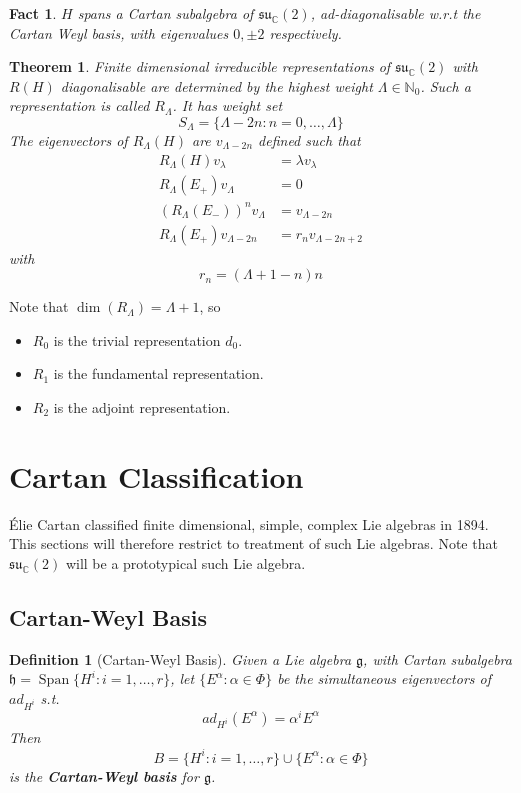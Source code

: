 \documentclass{article}
\newtheorem{theorem}{Theorem}[subsection]
\newtheorem{definition}{Definition}[subsection]
\newtheorem{fact}{Fact}[subsection]
\DeclareMathOperator{\spn}{Span}
\newcommand{\bam}[1]{\textbf{#1}}
\newcommand{\mf}[1]{\mathfrak{#1}}
\newcommand{\mbb}[1]{\mathbb{#1}}
\newcommand{\set}[1]{\lbrace #1 \rbrace}
\begin{document}
\begin{fact}
$H$ spans a Cartan subalgebra of $\mf{su}_\mbb{C}(2)$, ad-diagonalisable w.r.t the Cartan Weyl basis, with eigenvalues $0, \pm 2$ respectively. 
\end{fact}

\begin{theorem}
Finite dimensional irreducible representations of $\mf{su}_\mbb{C}(2)$ with $R(H)$ diagonalisable are determined by the highest weight $\Lambda\in\mbb{N}_0$. Such a representation is called $R_\Lambda$. It has weight set 
\[
S_\Lambda=\lbrace \Lambda-2n : n=0,\dots,\Lambda \rbrace
\]
The eigenvectors of $R_\Lambda(H)$ are $v_{\Lambda-2n}$ defined such that 
\begin{align*}
R_\Lambda(H) v_\lambda &= \lambda v_\lambda \\
R_\Lambda(E_+) v_\Lambda &= 0 \\
 \left(R_\Lambda(E_-)\right)^n v_{\Lambda} &= v_{\Lambda-2n} \\
 R_\Lambda(E_+) v_{\Lambda-2n} &= r_n v_{\Lambda-2n+2}
\end{align*}
with 
\[
r_n=(\Lambda+1-n)n
\]
\end{theorem}
Note that $\dim(R_\Lambda)=\Lambda+1$, so 
\begin{itemize}
    \item $R_0$ is the trivial representation $d_0$.
    \item $R_1$ is the fundamental representation.
    \item $R_2$ is the adjoint representation. 
\end{itemize}
\section{Cartan Classification}
\'Elie Cartan classified finite dimensional, simple, complex Lie algebras in 1894. This sections will therefore restrict to treatment of such Lie algebras. Note that $\mf{su}_\mbb{C}(2)$ will be a prototypical such Lie algebra. 

\subsection{Cartan-Weyl Basis}

\begin{definition}[Cartan-Weyl Basis]
Given a Lie algebra $\mf{g}$, with Cartan subalgebra $\mf{h}=\spn\set{ H^i : i=1,\dots,r }$, let $\set{  E^\alpha : \alpha\in\Phi  }$ be the simultaneous eigenvectors of $ad_{H^i}$ s.t. 
\[
ad_{H^i}\left(E^\alpha \right)=\alpha^i E^\alpha
\]
Then 
\[
B=\lbrace H^i : i=1,\dots,r\rbrace \cup \lbrace E^\alpha : \alpha\in\Phi \rbrace
\]
is the \bam{Cartan-Weyl basis} for $\mf{g}$.
\end{definition}
\end{document}
